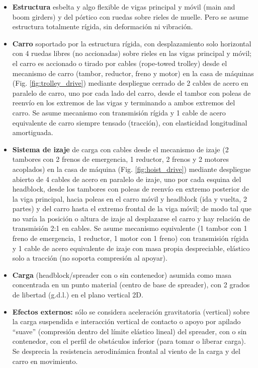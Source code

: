 \documentclass{article}
\begin{document}
\begin{itemize}
    \item \textbf{Estructura} esbelta y algo flexible de vigas principal y móvil (main and boom girders) y del pórtico con ruedas sobre rieles de muelle. Pero se asume estructura totalmente rígida, sin deformación ni vibración.
    
    \item \textbf{Carro} soportado por la estructura rígida, con desplazamiento solo horizontal con 4 ruedas libres (no accionadas) sobre rieles en las vigas principal y móvil; el carro es accionado o tirado por cables (rope-towed trolley) desde el mecanismo de carro (tambor, reductor, freno y motor) en la casa de máquinas (Fig. \ref{fig:trolley_drive}) mediante despliegue cerrado de 2 cables de acero en paralelo de carro, uno por cada lado del carro, desde el tambor con poleas de reenvío en los extremos de las vigas y terminando a ambos extremos del carro. Se asume mecanismo con transmisión rígida y 1 cable de acero equivalente de carro siempre tensado (tracción), con elasticidad longitudinal amortiguada.
    
    \item \textbf{Sistema de izaje} de carga con cables desde el mecanismo de izaje (2 tambores con 2 frenos de emergencia, 1 reductor, 2 frenos y 2 motores acoplados) en la casa de máquina (Fig. \ref{fig:hoist_drive}) mediante despliegue abierto de 4 cables de acero en paralelo de izaje, uno por cada esquina del headblock, desde los tambores con poleas de reenvío en extremo posterior de la viga principal, hacia poleas en el carro móvil y headblock (ida y vuelta, 2 partes) y del carro hasta el extremo frontal de la viga móvil; de modo tal que no varía la posición o altura de izaje al desplazarse el carro y hay relación de transmisión 2:1 en cables. Se asume mecanismo equivalente (1 tambor con 1 freno de emergencia, 1 reductor, 1 motor con 1 freno) con transmisión rígida y 1 cable de acero equivalente de izaje con masa propia despreciable, elástico solo a tracción (no soporta compresión al apoyar).
    
    \item \textbf{Carga} (headblock/spreader con o sin contenedor) asumida como masa concentrada en un punto material (centro de base de spreader), con 2 grados de libertad (g.d.l.) en el plano vertical 2D.
    
    \item \textbf{Efectos externos:} sólo se considera aceleración gravitatoria (vertical) sobre la carga suspendida e interacción vertical de contacto o apoyo por apilado ``suave'' (compresión dentro del límite elástico lineal) del spreader, con o sin contenedor, con el perfil de obstáculos inferior (para tomar o liberar carga). Se desprecia la resistencia aerodinámica frontal al viento de la carga y del carro en movimiento.


\end{itemize}
\end{document}
